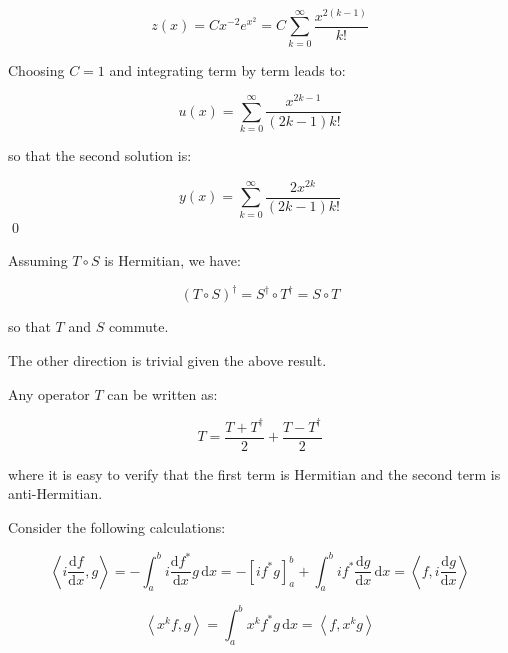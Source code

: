 \documentclass[12pt]{article}
\begin{document}
\begin{equation}
    z(x) = C x^{-2} e^{x^{2}} = C \sum_{k=0}^{\infty} \frac{x^{2(k-1)}}{k!}
\end{equation}

Choosing $C = 1$ and integrating term by term leads to:

\begin{equation}
    u(x) = \sum_{k=0}^{\infty} \frac{x^{2k-1}}{(2k-1)k!}
\end{equation}

so that the second solution is:

\begin{equation}
    y(x) = \sum_{k=0}^{\infty} \frac{2x^{2k}}{(2k-1)k!}
\end{equation}
\qed



Assuming $T \circ S$ is Hermitian, we have:

\begin{equation}
    (T \circ S)^{\dagger} = S^{\dagger} \circ T^{\dagger} = S \circ T
\end{equation}

so that $T$ and $S$ commute.

The other direction is trivial given the above result.

Any operator $T$ can be written as:

\begin{equation}
    T = \frac{T + T^{\dagger}}{2} + \frac{T - T^{\dagger}}{2}
\end{equation}

where it is easy to verify that the first term is Hermitian and the second term is anti-Hermitian.

Consider the following calculations:

\begin{equation}
    \left\langle i \frac{\mathrm{d}f}{\mathrm{d}x}, g \right\rangle = -\int_{a}^{b} i \frac{\mathrm{d}f^{*}}{\mathrm{d}x} g \, \mathrm{d}x = -\left[ i f^{*} g \right]_{a}^{b} + \int_{a}^{b} i f^{*} \frac{\mathrm{d}g}{\mathrm{d}x} \, \mathrm{d}x = \left\langle f, i \frac{\mathrm{d}g}{\mathrm{d}x} \right\rangle
\end{equation}

\begin{equation}
    \left\langle x^{k} f, g \right\rangle = \int_{a}^{b} x^{k} f^{*} g \, \mathrm{d}x = \left\langle f, x^{k} g \right\rangle
\end{equation}
\end{document}

